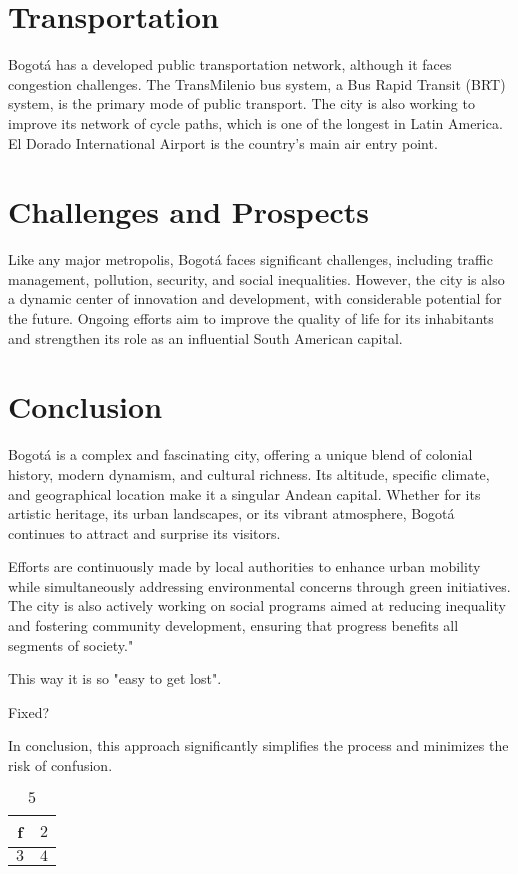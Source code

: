 \documentclass{article}
\begin{document}
\section{Transportation}
Bogotá has a developed public transportation network, although it faces congestion challenges. The TransMilenio bus system, a Bus Rapid Transit (BRT) system, is the primary mode of public transport. The city is also working to improve its network of cycle paths, which is one of the longest in Latin America. El Dorado International Airport is the country's main air entry point.

\section{Challenges and Prospects}
Like any major metropolis, Bogotá faces significant challenges, including traffic management, pollution, security, and social inequalities. However, the city is also a dynamic center of innovation and development, with considerable potential for the future. Ongoing efforts aim to improve the quality of life for its inhabitants and strengthen its role as an influential South American capital.

\section{Conclusion}
Bogotá is a complex and fascinating city, offering a unique blend of colonial history, modern dynamism, and cultural richness. Its altitude, specific climate, and geographical location make it a singular Andean capital. Whether for its artistic heritage, its urban landscapes, or its vibrant atmosphere, Bogotá continues to attract and surprise its visitors.

Efforts are continuously made by local authorities to enhance urban mobility while simultaneously addressing environmental concerns through green initiatives. The city is also actively working on social programs aimed at reducing inequality and fostering community development, ensuring that progress benefits all segments of society."

This way it is so "easy to get lost".

Fixed?

In conclusion, this approach significantly simplifies the process and minimizes the risk of confusion.

\begin{table}[h!]
    \centering
    \begin{tabular}{|c|c|}
        \hline
        f & $2$ \\
        \hline
        $3$ & $4$ \\
        \hline
    \end{tabular}
    \caption{$5$}
    \label{tab:my_label}
\end{table}
\end{document}
